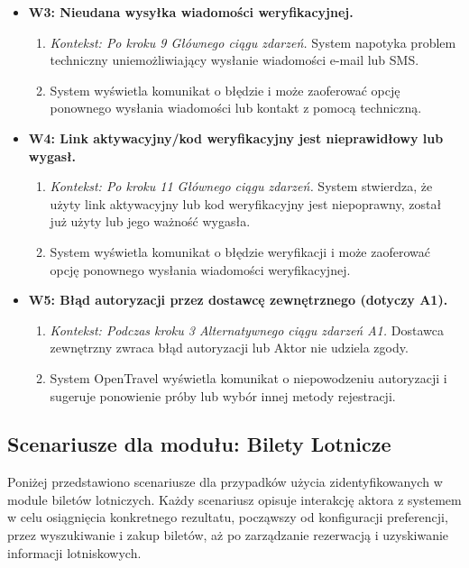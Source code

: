 \documentclass[a4paper,12pt]{article}
\begin{document}
\begin{itemize}
\begin{itemize}
\begin{enumerate}
                \end{enumerate}
            \item \textbf{W3: Nieudana wysyłka wiadomości weryfikacyjnej.}
                \begin{enumerate}
                    \item \textit{Kontekst: Po kroku 9 Głównego ciągu zdarzeń.} System napotyka problem techniczny uniemożliwiający wysłanie wiadomości e-mail lub SMS.
                    \item System wyświetla komunikat o błędzie i może zaoferować opcję ponownego wysłania wiadomości lub kontakt z pomocą techniczną.
                \end{enumerate}
            \item \textbf{W4: Link aktywacyjny/kod weryfikacyjny jest nieprawidłowy lub wygasł.}
                \begin{enumerate}
                    \item \textit{Kontekst: Po kroku 11 Głównego ciągu zdarzeń.} System stwierdza, że użyty link aktywacyjny lub kod weryfikacyjny jest niepoprawny, został już użyty lub jego ważność wygasła.
                    \item System wyświetla komunikat o błędzie weryfikacji i może zaoferować opcję ponownego wysłania wiadomości weryfikacyjnej.
                \end{enumerate}
            \item \textbf{W5: Błąd autoryzacji przez dostawcę zewnętrznego (dotyczy A1).}
                \begin{enumerate}
                    \item \textit{Kontekst: Podczas kroku 3 Alternatywnego ciągu zdarzeń A1.} Dostawca zewnętrzny zwraca błąd autoryzacji lub Aktor nie udziela zgody.
                    \item System OpenTravel wyświetla komunikat o niepowodzeniu autoryzacji i sugeruje ponowienie próby lub wybór innej metody rejestracji.
                \end{enumerate}
        \end{itemize}
\end{itemize}

\subsection{Scenariusze dla modułu: Bilety Lotnicze}
Poniżej przedstawiono scenariusze dla przypadków użycia zidentyfikowanych w module biletów lotniczych. Każdy scenariusz opisuje interakcję aktora z systemem w celu osiągnięcia konkretnego rezultatu, począwszy od konfiguracji preferencji, przez wyszukiwanie i zakup biletów, aż po zarządzanie rezerwacją i uzyskiwanie informacji lotniskowych.
\end{document}

